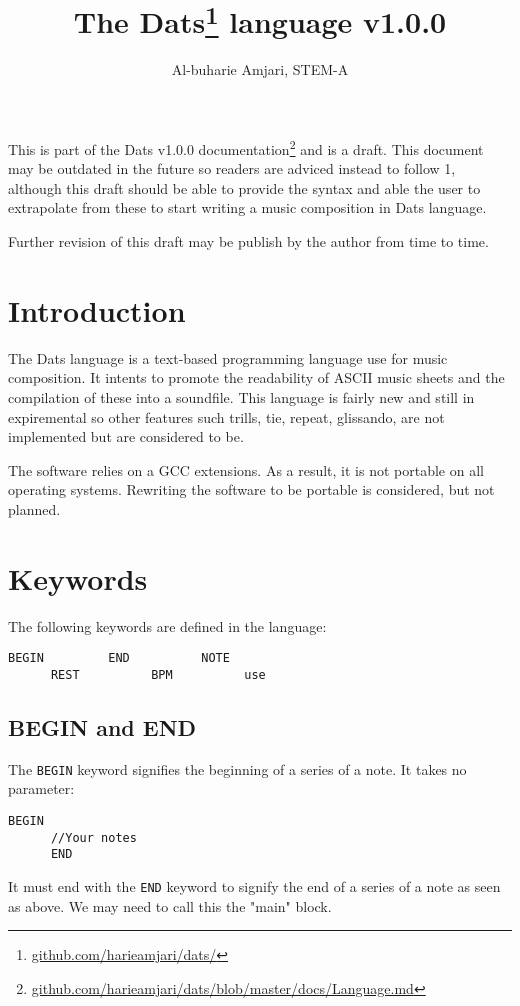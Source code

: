 \documentclass{article}
\title{\textbf{The Dats\thanks{\url{github.com/harieamjari/dats/}} language v1.0.0}}
\author{Al-buharie Amjari, STEM-A}
\begin{document}
\maketitle

\abstract
This is part of the Dats v1.0.0 documentation\footnote{\url{github.com/harieamjari/dats/blob/master/docs/Language.md}} and is a draft. This document may be outdated in the future so readers are adviced instead to follow 1, although this draft should be able to provide the syntax and able the user to extrapolate from these to
start writing a music composition in Dats language.

Further revision of this draft may be publish by the author from time to time.


\section{Introduction}

\indent The Dats language is a text-based programming language use for music composition.  It intents to promote the readability of ASCII music sheets and the compilation of these into a soundfile.
This language is fairly new and still in expiremental so other features such trills, tie,
repeat, glissando, are not implemented but are considered to be.

The software relies on a GCC extensions. As a result, it is not portable on all operating systems. Rewriting the software to be portable is considered, but not planned. 


\section{Keywords}

The following keywords are defined in the language:
\begin{Verbatim}[frame=single]
      BEGIN         END          NOTE 
      REST          BPM          use
\end{Verbatim}

\subsection{BEGIN and END}

The \verb+BEGIN+ keyword signifies the beginning of a series of a note. It
takes no parameter:
\begin{Verbatim}[frame=single]
      BEGIN
      //Your notes
      END
\end{Verbatim}
It must end with the \verb+END+ keyword to signify the end of a series
of a note as seen as above. We may need to call this the "main" block.
\end{document}
